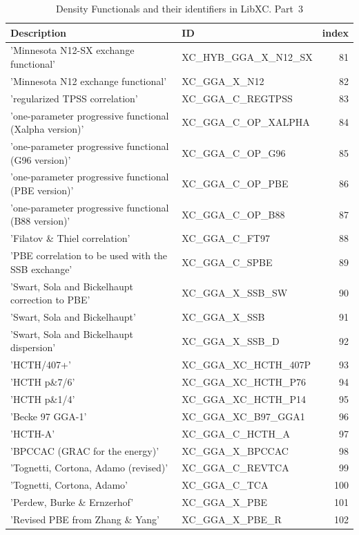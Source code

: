 \documentclass[final,12pt]{article}
\begin{document}
{{{{{{\begin{table}[!h]
\caption{Density Functionals and their identifiers in LibXC. Part~3}
\begin{center}
\begin{tabular}{llr}
\hline
\hline
Description & ID & index\\
\hline
  'Minnesota N12-SX exchange functional' & XC\_HYB\_GGA\_X\_N12\_SX  & 81\\
  'Minnesota N12 exchange functional' & XC\_GGA\_X\_N12  & 82\\
  'regularized TPSS correlation' & XC\_GGA\_C\_REGTPSS  & 83\\
  'one-parameter progressive functional (Xalpha version)' & XC\_GGA\_C\_OP\_XALPHA  & 84\\
  'one-parameter progressive functional (G96 version)' & XC\_GGA\_C\_OP\_G96  & 85\\
  'one-parameter progressive functional (PBE version)' & XC\_GGA\_C\_OP\_PBE  & 86\\
  'one-parameter progressive functional (B88 version)' & XC\_GGA\_C\_OP\_B88  & 87\\
  'Filatov \& Thiel correlation' & XC\_GGA\_C\_FT97  & 88\\
  'PBE correlation to be used with the SSB exchange' & XC\_GGA\_C\_SPBE  & 89\\
  'Swart, Sola and Bickelhaupt correction to PBE' & XC\_GGA\_X\_SSB\_SW  & 90\\
  'Swart, Sola and Bickelhaupt' & XC\_GGA\_X\_SSB  & 91\\
  'Swart, Sola and Bickelhaupt dispersion' & XC\_GGA\_X\_SSB\_D  & 92\\
  'HCTH/407+' & XC\_GGA\_XC\_HCTH\_407P  & 93\\
  'HCTH p\&7/6' & XC\_GGA\_XC\_HCTH\_P76  & 94\\
  'HCTH p\&1/4' & XC\_GGA\_XC\_HCTH\_P14  & 95\\
  'Becke 97 GGA-1' & XC\_GGA\_XC\_B97\_GGA1  & 96\\
  'HCTH-A' & XC\_GGA\_C\_HCTH\_A  & 97\\
  'BPCCAC (GRAC for the energy)' & XC\_GGA\_X\_BPCCAC  & 98\\
  'Tognetti, Cortona, Adamo (revised)' & XC\_GGA\_C\_REVTCA  & 99\\
  'Tognetti, Cortona, Adamo' & XC\_GGA\_C\_TCA  &100\\
  'Perdew, Burke \& Ernzerhof' & XC\_GGA\_X\_PBE  &101\\
  'Revised PBE from Zhang \& Yang' & XC\_GGA\_X\_PBE\_R  &102\\

\end{tabular}
\end{center}
\end{table}}}}}}}
\end{document}
